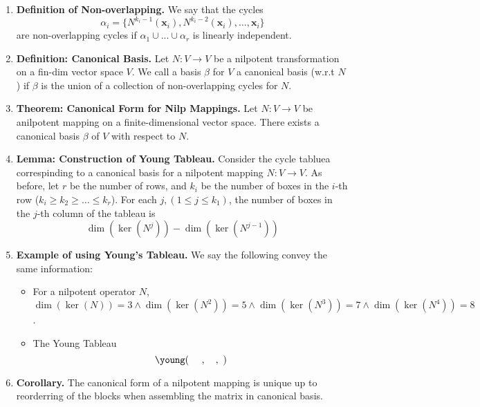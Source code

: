 \documentclass[oneside, 12pt]{book}
\newcommand{\settag}[1]{\renewcommand{\theenumi}{#1}}
\newcommand{\tbf}[1]{\textbf{#1}}
\newcommand{\trans}[3]{$#1:#2\rightarrow{}#3$}
\newcommand{\para}[1]{\item \tbf{#1}}
\newcommand{\vx}{\mathbf{x}}
\begin{document}
\begin{enumerate}
    \settag{6.2.5}
    \para{Definition of Non-overlapping.} We say that the cycles 
    $$\alpha_i = \{N^{k_i-1}(\vx_i),N^{k_i-2}(\vx_i),\ldots,\vx_i\}$$ are non-overlapping cycles 
    if $\alpha_1\cup ...\cup \alpha_r$ is linearly independent.

    \settag{6.2.7}
    \para{Definition: Canonical Basis.} Let \trans{N}{V}{V} be a nilpotent transformation on a fin-dim vector space $V$. We call a basis $\beta$ for $V$
    a canonical basis (w.r.t $N$) if $\beta$ is the union of a collection of non-overlapping cycles for $N$.

    \settag{6.2.8}
    \para{Theorem: Canonical Form for Nilp Mappings.} Let \trans{N}{V}{V} be anilpotent mapping on a finite-dimensional vector space. 
    There exists a canonical basis $\beta$ of $V$ with respect to $N$.

    \settag{6.2.9}
    \para{Lemma: Construction of Young Tableau.} Consider the cycle tabluea correspinding to a canonical basis for a nilpotent mapping \trans{N}{V}{V}. 
    As before, let $r$ be the number of rows, and $k_i$ be the number of boxes in the $i$-th row ($k_i \geq k_2 \geq \dots\leq k_r$). For each 
    $j, (1\leq j\leq k_1)$, the number of boxes in the $j$-th column of the tableau is \newline
    \begin{equation*}
        \dim(\ker(N^j)) - \dim(\ker(N^{j-1}))
    \end{equation*}

    \settag{6.2.10}
    \para{Example of using Young's Tableau.} We say the following convey the same information:
    \begin{itemize}
        \item For a nilpotent operator $N$, $\dim(\ker(N)) = 3\land \dim(\ker(N^2)) = 5 \land \dim(\ker(N^3)) = 7\land \dim(\ker(N^4)) = 8$.
        \item The Young Tableau
            \begin{equation*}
                \young(~~~~,~~~,~)
            \end{equation*}
    \end{itemize}

    \settag{6.2.11}
    \para{Corollary.} The canonical form of a nilpotent mapping is unique up to reorderring of the blocks when assembling the matrix in canonical basis.
\end{enumerate}
\end{document}

